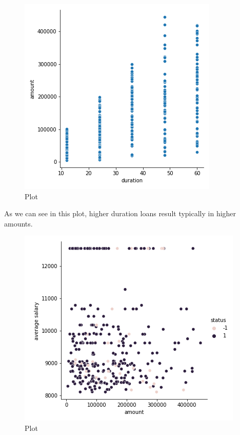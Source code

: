 \documentclass[a4paper,12pt]{report}
\begin{document}
		\begin{figure}[H]
		\begin{center}
		\includegraphics[scale=0.40]{ammount_duration_scatterPlot}	
		\end{center}
		\caption{Plot}
		\label{fig:ammount_duration_scatterPlot}
		\end{figure}

		As we can see in this plot, higher duration loans result typically in higher amounts.

		\begin{figure}[H]
		\begin{center}
		\includegraphics[scale=0.40]{avgSalary_ammount}	
		\end{center}
		\caption{Plot}
		\label{fig:avgSalary_ammount}
		\end{figure}
\end{document}
